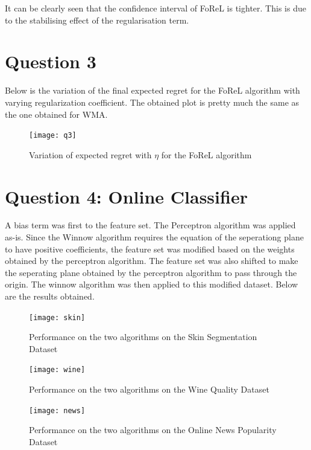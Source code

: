 \documentclass{article}
\begin{document}
It can be clearly seen that the confidence interval of FoReL is tighter. This is due to the stabilising effect of the regularisation term.

\newpage
\section*{Question 3}

Below is the variation of the final expected regret for the FoReL algorithm with varying regularization coefficient. The obtained plot is pretty much the same as the one obtained for WMA.
\begin{figure}[h!]
\centering
\texttt{[image: q3]}
\caption{Variation of expected regret with $\eta$ for the FoReL algorithm}
\end{figure}

\newpage
\section*{Question 4: Online Classifier}
A bias term was first to the feature set. The Perceptron algorithm was applied as-is. Since the Winnow algorithm requires the equation of the seperationg plane to have positive coefficients, the feature set was modified based on the weights obtained by the perceptron algorithm. The feature set was also shifted to make the seperating plane obtained by the perceptron algorithm to pass through the origin. The winnow algorithm was then applied to this modified dataset. Below are the results obtained.
\begin{figure}[h!]
\centering
\texttt{[image: skin]}
\caption{Performance on the two algorithms on the Skin Segmentation Dataset}
\end{figure}

\begin{figure}[h!]
\centering
\texttt{[image: wine]}
\caption{Performance on the two algorithms on the Wine Quality Dataset}
\end{figure}

\begin{figure}[t!]
\centering
\texttt{[image: news]}
\caption{Performance on the two algorithms on the Online News Popularity Dataset}
\end{figure}

\newpage
\end{document}
